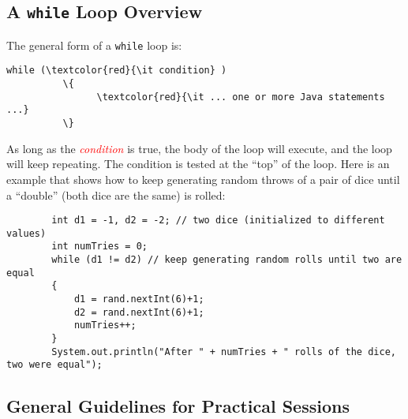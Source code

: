 \vspace{-0.1in}
\subsection*{A {\tt while} Loop Overview}
\vspace*{-.05in}

The general form of a {\tt while} loop is:

\vspace*{-.1in}

\begin{Verbatim}[commandchars=\\\{\}]
          while (\textcolor{red}{\it condition} )
          \{
                \textcolor{red}{\it ... one or more Java statements ...}
          \}
          \end{Verbatim}

          \vspace{-0.15in}

          As long as the \textcolor{red}{\it condition} is true, the body of the loop will execute, and the loop will
          keep repeating. The condition is tested at the ``top'' of the loop.  Here is an example that shows how to keep
          generating random throws of a pair of dice until a ``double'' (both dice are the same) is rolled:

          \vspace{-0.05in}

          \begin{verbatim}
        int d1 = -1, d2 = -2; // two dice (initialized to different values)
        int numTries = 0;
        while (d1 != d2) // keep generating random rolls until two are equal
        {
            d1 = rand.nextInt(6)+1;
            d2 = rand.nextInt(6)+1;
            numTries++;
        }
        System.out.println("After " + numTries + " rolls of the dice, two were equal");
          \end{verbatim}

          \vspace*{-.275in}
          \subsection*{General Guidelines for Practical Sessions}
          \vspace*{-.05in}

